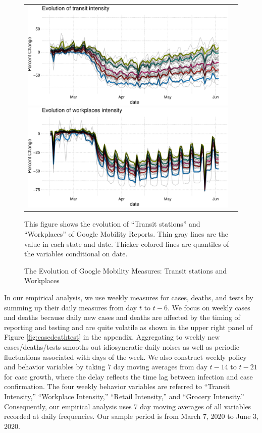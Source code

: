 \documentclass[11pt,reqno,letter]{amsart}
\theoremstyle{definition}
\begin{document}
\begin{figure}\caption{The Evolution of Google Mobility Measures: Transit stations and Workplaces\label{fig:transit-workplaces}}\vspace{0.1cm}
    \begin{tabular}{cc}
      \includegraphics[width=0.5\linewidth]{tables_and_figures/transit}
      \includegraphics[width=0.5\linewidth]{tables_and_figures/workplaces}
       \end{tabular}
        \begin{flushleft}
        \scriptsize{This figure shows the evolution of ``Transit stations'' and  ``Workplaces'' of Google Mobility
      Reports. Thin gray lines are the value in each state and date. Thicker colored lines are
      quantiles of the variables conditional on date.}
      \end{flushleft}
\end{figure}



In our empirical analysis, we use weekly measures for cases, deaths,
and tests by summing up their daily measures from day \(t\) to
\(t-6\).  We focus on weekly cases and deaths because daily new cases and deaths are
affected by the timing of reporting and testing and are quite
volatile as shown in the upper right panel of Figure \ref{fig:casedeathtest} in the
appendix.  Aggregating to weekly new cases/deaths/tests smooths
out idiosyncratic daily noises as well as periodic fluctuations
associated with days of the week.
We also construct weekly policy and
behavior variables by taking 7 day moving averages from day \(t-14\) to
\(t-21\) for case growth, where the  delay reflects the time lag between infection and case confirmation. The four weekly behavior variables are referred  to ``Transit
Intensity,'' ``Workplace Intensity,'' ``Retail Intensity,'' and ``Grocery
Intensity.'' Consequently, our empirical analysis uses 7 day moving averages of all variables recorded at daily frequencies. Our sample period is from March 7, 2020 to June 3, 2020.
\end{document}
